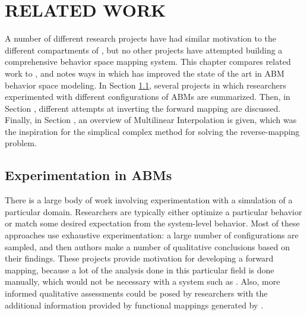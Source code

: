 \chapter{RELATED WORK}
\thispagestyle{plain}

\label{RelatedWork}

A number of different research projects have had similar motivation to the different compartments of \fw, but no other projects have attempted building a comprehensive behavior space mapping system.
This chapter compares related work to \fw, and notes ways in which \fw has improved the state of the art in ABM behavior space modeling.
In Section \ref{sec:abmexp}, several projects in which researchers experimented with different configurations of ABMs are summarized.
Then, in Section \label{sec:invfm}, different attempts at inverting the forward mapping are discussed.
Finally, in Section \label{sec:multilinear}, an overview of Multilinear Interpolation is given, which was the inspiration for the simplical complex method for solving the reverse-mapping problem.

\section{Experimentation in ABMs}
\label{sec:abmexp}

There is a large body of work involving experimentation with a simulation of a particular domain.
Researchers are typically either optimize a particular behavior or match some desired expectation from the system-level behavior.
Most of these approaches use exhaustive experimentation: a large number of configurations are sampled, and then authors make a number of qualitative conclusions based on their findings.
These projects provide motivation for developing a forward mapping, because a lot of the analysis done in this particular field is done manually, which would not be necessary with a system such as \fw.
Also, more informed qualitative assessments could be posed by researchers with the additional information provided by functional mappings generated by \fw.

